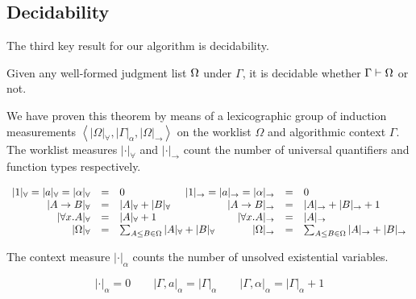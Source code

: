 \subsection{Decidability}

The third key result for our algorithm is decidability.
\begin{theorem}[Decidability]
	Given any well-formed judgment list $\Omega$ under $\Gamma$, it is decidable whether $\Gamma\vdash \Omega$ or not.
\end{theorem}

\noindent We have proven this theorem by means of a lexicographic group of induction
measurements $\left\langle|\Omega|_\forall,|\Gamma|_\alpha, |\Omega|_\to\right\rangle$ on the worklist $\Omega$
and algorithmic context $\Gamma$. 
The worklist measures $|\cdot|_\forall$ and $|\cdot|_\to$ count the
number of universal quantifiers and function types respectively.
\begin{definition}
\[
\begin{array}{rcl@{\hspace{-10mm}}rclrcl} 
|1|_\forall = |a|_\forall = |\alpha|_\forall &=& 0      &|1|_\to = |a|_\to = |\alpha|_\to &=& 0        \\
|A\to B|_\forall &=& |A|_\forall + |B|_\forall  &|A\to B|_\to &=& |A|_\to + |B|_\to + 1\\
|\forall x. A|_\forall &=& |A|_\forall + 1              &|\forall x. A|_\to &=& |A|_\to                        \\
|\exps|_\forall &=& \sum_{A \le B\in \exps} |A|_\forall + |B|_\forall       &|\exps|_\to &=& \sum_{A \le B \in \exps} |A|_\to + |B|_\to
\end{array}
\]
\end{definition}

\noindent The context measure $|\cdot|_\alpha$ counts the number of unsolved existential variables.
\begin{definition}
$$|\cdot|_\alpha = 0\qquad
|\Gamma,a|_\alpha = |\Gamma|_\alpha\qquad
|\Gamma,\alpha|_\alpha = |\Gamma|_\alpha + 1$$
\end{definition}

